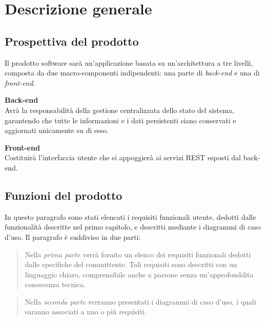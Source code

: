 \chapter{Descrizione generale} %


\section{Prospettiva del prodotto}
Il prodotto software sarà un'applicazione basata su un'architettura a tre livelli, composta da due macro-componenti indipendenti: una parte di \textit{back-end} e una di \textit{front-end}. 

\textbf{Back-end} \\
Avrà la responsabilità della gestione centralizzata dello stato del sistema, garantendo che tutte le informazioni e i dati persistenti siano conservati e aggiornati unicamente su di esso.

\textbf{Front-end} \\
Costituirà l'interfaccia utente che si appoggierà ai servizi REST esposti dal back-end.

\section{Funzioni del prodotto}
In questo paragrafo sono stati elencati i requisiti funzionali utente, dedotti dalle funzionalità descritte nel primo capitolo, e descritti mediante i diagrammi di caso d'uso.
Il paragrafo è suddiviso in due parti:

\begin{quote}
Nella \textit{prima parte} verrà fornito un elenco dei requisiti funzionali dedotti dalle specifiche del committente. 
Tali requisiti sono descritti con un linguaggio chiaro, comprensibile anche a parsone senza un'approfonddita conoscenza tecnica.     
\end{quote}

\begin{quote}
Nella \textit{seconda parte} verranno presentati i diagrammi di caso d'uso, i quali saranno associati a uno o più requisiti.
\end{quote}

